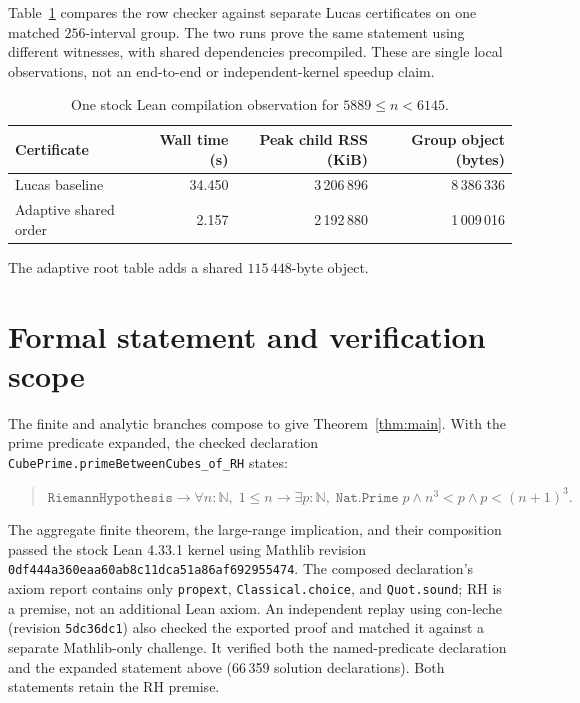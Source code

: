 \documentclass[10pt]{article}
\begin{document}
Table~\ref{tab:pilot} compares the row checker against separate Lucas certificates on one matched \(256\)-interval group. The two runs prove the same statement using different witnesses, with shared dependencies precompiled. These are single local observations, not an end-to-end or independent-kernel speedup claim.

\begin{table}[ht]
\centering
\caption{One stock Lean compilation observation for \(5889\le n<6145\).}
\label{tab:pilot}
\begin{tabular}{lrrr}
\toprule
Certificate & Wall time (s) & Peak child RSS (KiB) & Group object (bytes)\\
\midrule
Lucas baseline & 34.450 & 3\,206\,896 & 8\,386\,336\\
Adaptive shared order & 2.157 & 2\,192\,880 & 1\,009\,016\\
\bottomrule
\end{tabular}
\par\smallskip
{\small The adaptive root table adds a shared \(115\,448\)-byte object.}
\end{table}

\section{Formal statement and verification scope}

The finite and analytic branches compose to give Theorem~\ref{thm:main}.
With the prime predicate expanded, the checked declaration
\texttt{CubePrime.primeBetweenCubes\_of\_RH} states:
\begin{quote}
\small
\(\texttt{RiemannHypothesis} \to
  \forall n:\mathbb{N},\; 1\le n\to
  \exists p:\mathbb{N},\;
  \texttt{Nat.Prime}\;p\land n^3<p\land p<(n+1)^3.\)
\end{quote}
The aggregate finite theorem, the large-range implication, and their
composition passed the stock Lean 4.33.1 kernel using Mathlib revision
\texttt{0df444a360eaa60ab8c11dca51a86af692955474}. The composed
declaration's axiom report contains only \texttt{propext},
\texttt{Classical.choice}, and \texttt{Quot.sound}; RH is a premise, not an
additional Lean axiom.
An independent replay using con-leche (revision \texttt{5dc36dc1}) also checked the
exported proof and matched it against a separate Mathlib-only challenge.
It verified both the named-predicate declaration and the expanded
statement above (66\,359 solution declarations). Both statements retain
the RH premise.
\end{document}
